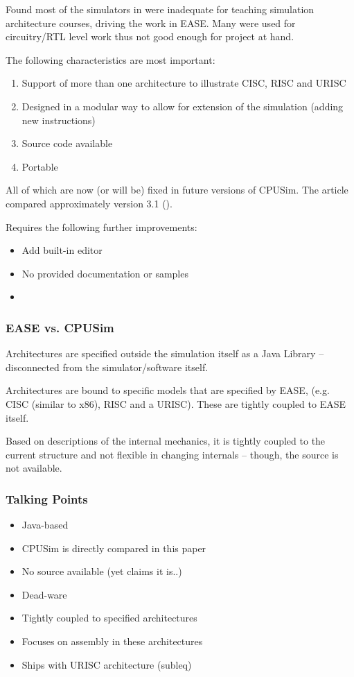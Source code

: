 Found most of the simulators in \cite{Nikolic2009} were inadequate for teaching simulation architecture courses, driving the work in EASE. Many were used for circuitry/RTL level work thus not good enough for project at hand. 

The following characteristics are most important: 

\begin{enumerate}
    \item Support of more than one architecture to illustrate CISC, RISC and URISC
    \item Designed in a modular way to allow for extension of the simulation (adding new instructions)
    \item Source code available
    \item Portable
\end{enumerate}

All of which are now (or will be) fixed in future versions of CPUSim. The article compared approximately version 3.1 (\cite{Skrien2001}). 

Requires the following further improvements: 

\begin{itemize}
    \item Add built-in editor
    \item No provided documentation or samples
    \item 
\end{itemize}

\subsubsection{EASE vs. CPUSim}

Architectures are specified outside the simulation itself as a Java Library -- disconnected from the simulator/software itself. 

Architectures are bound to specific models that are specified by EASE, (e.g. CISC (similar to x86), RISC and a URISC). These are tightly coupled to EASE itself. 

Based on descriptions of the internal mechanics, it is tightly coupled to the current structure and not flexible in changing internals -- though, the source is not available. 


\subsubsection{Talking Points}

\begin{itemize}
    \item Java-based
    \item CPUSim is directly compared in this paper
    \item No source available (yet claims it is..)
    \item Dead-ware
    \item Tightly coupled to specified architectures
    \item Focuses on assembly in these architectures
    \item Ships with URISC architecture (subleq)
\end{itemize}


